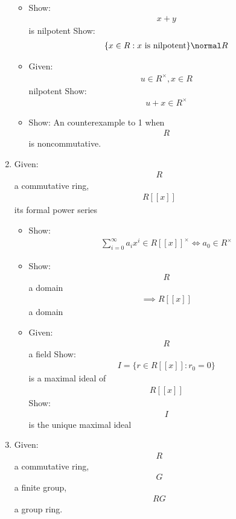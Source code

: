 \begin{enumerate}
  \begin{itemize}
  \tightlist
  \item
    Show: \begin{align*}x+y\end{align*} is nilpotent Show:
    \begin{align*}\{x\in R : x \text{ is nilpotent}\} \normal R\end{align*}
  \item
    Given: \begin{align*}u\in R^\times, x\in R\end{align*} nilpotent
    Show: \begin{align*}u+x\in R^\times\end{align*}
  \item
    Show: An counterexample to 1 when \begin{align*}R\end{align*} is
    noncommutative.
  \end{itemize}
\item
  Given: \begin{align*}R\end{align*} a commutative ring,
  \begin{align*}R[[x]]\end{align*} its formal power series

  \begin{itemize}
  \tightlist
  \item
    Show:
    \begin{align*}\sum_{i=0}^\infty a_i x^i \in R[[x]]^\times \iff a_0 \in R^\times\end{align*}
  \item
    Show: \begin{align*}R\end{align*} a domain
    \begin{align*}\implies R[[x]]\end{align*} a domain
  \item
    Given: \begin{align*}R\end{align*} a field Show:
    \begin{align*}I = \{ r \in R[[x]] : r_0 = 0\}\end{align*} is a
    maximal ideal of \begin{align*}R[[x]]\end{align*} Show:
    \begin{align*}I\end{align*} is the unique maximal ideal
  \end{itemize}
\item
  Given: \begin{align*}R\end{align*} a commutative ring,
  \begin{align*}G\end{align*} a finite group,
  \begin{align*}RG\end{align*} a group ring.


\end{enumerate}
